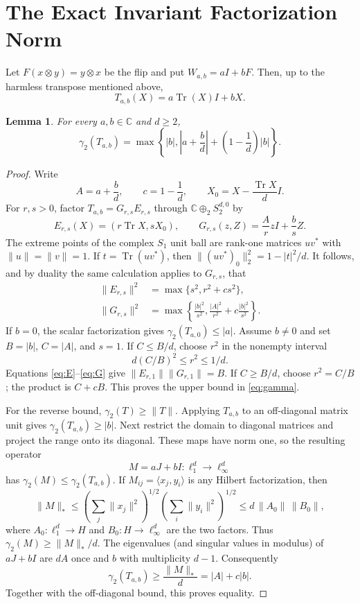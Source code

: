 \documentclass[11pt]{amsart}
\newtheorem{lemma}{Lemma}
\newcommand{\Tr}{\operatorname{Tr}}
\newcommand{\gammatwo}{\gamma_2}
\begin{document}
\section*{The Exact Invariant Factorization Norm}

Let $F(x\otimes y)=y\otimes x$ be the flip and put
$W_{a,b}=aI+bF$.  Then, up to the harmless transpose mentioned above,
\[
 T_{a,b}(X)=a\Tr(X)I+bX.
\]

\begin{lemma}\label{lem:gamma}
For every $a,b\in\mathbb C$ and $d\geq2$,
\begin{equation}\label{eq:gamma}
 \gammatwo(T_{a,b})=
 \max\left\{|b|,
 \left|a+\frac bd\right|+\left(1-\frac1d\right)|b|\right\}.
\end{equation}
\end{lemma}

\begin{proof}
Write
\[
 A=a+\frac bd,\qquad c=1-\frac1d,
 \qquad X_0=X-\frac{\Tr X}{d}I.
\]
For $r,s>0$, factor $T_{a,b}=G_{r,s}E_{r,s}$ through
$\mathbb C\oplus_2 S_2^{d,0}$ by
\[
 E_{r,s}(X)=(r\Tr X,sX_0),\qquad
 G_{r,s}(z,Z)=\frac Ar zI+\frac bs Z.
\]
The extreme points of the complex $S_1$ unit ball are rank-one matrices
$uv^*$ with $\|u\|=\|v\|=1$.  If $t=\Tr(uv^*)$, then
$\|(uv^*)_0\|_2^2=1-|t|^2/d$.  It follows, and by duality the same calculation
applies to $G_{r,s}$, that
\begin{align}
 \|E_{r,s}\|^2&=\max\{s^2,r^2+cs^2\},\label{eq:E}\\
 \|G_{r,s}\|^2&=\max\left\{\frac{|b|^2}{s^2},
 \frac{|A|^2}{r^2}+c\frac{|b|^2}{s^2}\right\}.
 \label{eq:G}
\end{align}
If $b=0$, the scalar factorization gives $\gammatwo(T_{a,0})\leq|a|$.
Assume $b\ne0$ and set $B=|b|$, $C=|A|$, and $s=1$.  If $C\leq B/d$,
choose $r^2$ in the nonempty interval
\[
 d(C/B)^2\leq r^2\leq1/d.
\]
Equations \eqref{eq:E}--\eqref{eq:G} give
$\|E_{r,1}\|\|G_{r,1}\|=B$.  If $C\geq B/d$, choose
$r^2=C/B$; the product is $C+cB$.  This proves the upper bound in
\eqref{eq:gamma}.

For the reverse bound, $\gammatwo(T)\geq\|T\|$.  Applying $T_{a,b}$ to an
off-diagonal matrix unit gives $\gammatwo(T_{a,b})\geq|b|$.  Next restrict the
domain to diagonal matrices and project the range onto its diagonal.  These
maps have norm one, so the resulting operator
\[
 M=aJ+bI:\ell_1^d\longrightarrow\ell_\infty^d
\]
has $\gammatwo(M)\leq\gammatwo(T_{a,b})$.  If
$M_{ij}=\langle x_j,y_i\rangle$ is any Hilbert factorization, then
\[
 \|M\|_*\leq
 \left(\sum_j\|x_j\|^2\right)^{1/2}
 \left(\sum_i\|y_i\|^2\right)^{1/2}
 \leq d\,\|A_0\|\,\|B_0\|,
\]
where $A_0:\ell_1^d\to H$ and $B_0:H\to\ell_\infty^d$ are the two
factors.  Thus $\gammatwo(M)\geq\|M\|_*/d$.  The eigenvalues (and singular
values in modulus) of $aJ+bI$ are $dA$ once and $b$ with multiplicity
$d-1$.  Consequently
\[
 \gammatwo(T_{a,b})\geq\frac{\|M\|_*}{d}
 =|A|+c|b|.
\]
Together with the off-diagonal bound, this proves equality.
\end{proof}
\end{document}
